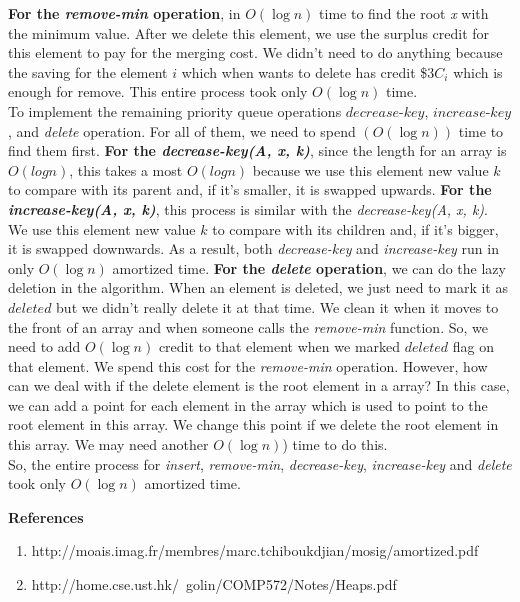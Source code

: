 \begin{homeworkProblem}
\textbf{For the \textit{remove-min} operation}, in $O(\log n)$ time to find the root \textit{x} with the minimum value. After we delete this element, we use the surplus credit for this element to pay for the merging cost.
We didn't need to do anything because the saving for the element $i$ which when wants to delete has credit \$$3C_i$ which is enough for remove. This entire process took only $O(\log n)$ time.
\\

To implement the remaining priority queue operations $decrease$-$key$, $increase$-$key$, and \textit{delete} operation. For all of them, we need to spend $(O(\log n))$ time to find them first. \textbf{For the \textit{decrease-key(A, x, k)}}, since the length for an array is $O(log n)$, this takes a most  $O(log n)$ because we use this element new value $k$ to compare with its parent and, if it's smaller, it is swapped upwards. \textbf{For the \textit{increase-key(A, x, k)}}, this process is similar with the \textit{decrease-key(A, x, k)}. We use this element new value $k$ to compare with its children and, if it's bigger, it is swapped downwards. As a result, both \textit{decrease-key} and \textit{increase-key} run in only $O(\log n)$ amortized time. \textbf{For the \textit{delete} operation}, we can do the lazy deletion in the algorithm. When an element is deleted, we just need to mark it as $deleted$ but we didn't really delete it at that time. We clean it when it moves to the front of an array and when someone calls the \textit{remove-min} function. So, we need to add $O(\log n)$ credit to that element when we marked $deleted$ flag on that element. We spend this cost for the \textit{remove-min} operation. However, how can we deal with if the delete element is the root element in a array? In this case, we can add a point for each element in the array which is used to point to the root element in this array. We change this point if we delete the root element in this array. We may need another $O(\log n)$) time to do this.\\

So, the entire process for \textit{insert}, \textit{remove-min}, \textit{decrease-key}, \textit{increase-key} and \textit{delete} took only $O(\log n)$ amortized time.

\end{homeworkProblem}

\pagebreak
\textbf{References}

\begin{enumerate}
    \item http://moais.imag.fr/membres/marc.tchiboukdjian/mosig/amortized.pdf
    \item http://home.cse.ust.hk/~golin/COMP572/Notes/Heaps.pdf
\end{enumerate}
